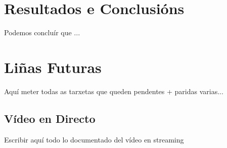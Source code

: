 \chapter{Resultados e Conclusións}

Podemos concluír que ...

\chapter{Liñas Futuras}
Aquí meter todas as tarxetas que queden pendentes + paridas varias...

  \section{Vídeo en Directo}
    Escribir aquí todo lo documentado del vídeo en streaming
  
